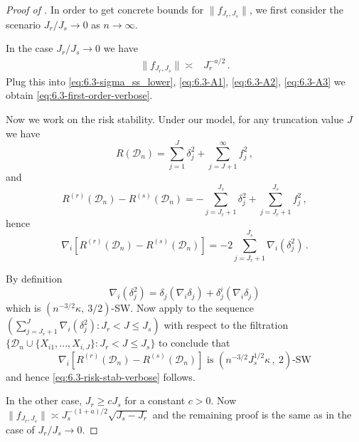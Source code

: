 \documentclass[11pt]{article}
\theoremstyle{plain}
\newcommand{\D}{{\mathcal{D}}}
\begin{document}
\begin{proof}[Proof of ]

In order to get concrete bounds for $\|f_{J_r,J_s}\|$, we first consider the scenario $J_r/J_s\rightarrow 0$ as $n\rightarrow\infty$. 

In the case $J_r/J_s\rightarrow 0$ we have 
\begin{align*}
\| f_{J_r,J_s}\|\asymp & J_r^{-a/2}\,.
\end{align*}
Plug this into \eqref{eq:6.3-sigma_ss_lower}, \eqref{eq:6.3-A1}, \eqref{eq:6.3-A2}, \eqref{eq:6.3-A3} we obtain
\eqref{eq:6.3-first-order-verbose}.

Now we work on the risk stability.  Under our model, for any truncation value $J$ we have
$$R(\D_n)=\sum_{j=1}^J \delta_j^2+\sum_{j=J+1}^\infty f_j^2\,,$$
and
$$
R^{(r)}(\D_n)-R^{(s)}(\D_n) = -\sum_{j=J_r+1}^{J_s} \delta_j^2+\sum_{j=J_r+1}^{J_s}f_j^2\,,
$$
hence
$$\nabla_i \left[R^{(r)}(\D_n)-R^{(s)}(\D_n)\right]=-2\sum_{j=J_r+1}^{J_s}\nabla_i(\delta_j^2)\,.$$

By definition
$$
\nabla_i(\delta_j^2) = \delta_j(\nabla_i\delta_j)+\delta_j^i(\nabla_i\delta_j)
$$
which is $(n^{-3/2}\kappa,~3/2)$-SW.  Now apply  to the sequence $(\sum_{j=J_r+1}^J\nabla_i(\delta_j^2):J_r<J\le J_s)$ with respect to the filtration $\{\D_n\cup\{X_{i1},...,X_{i,J}\}:J_r<J\le J_s\}$ to conclude that
$$
\nabla_i \left[R^{(r)}(\D_n)-R^{(s)}(\D_n)\right] \text{ is } \left(n^{-3/2}J_s^{1/2}\kappa\,,~2\right)\text{-SW}
$$
and hence \eqref{eq:6.3-risk-stab-verbose} follows.

In the other case, $J_r\ge  c J_s$ for a constant $c>0$. Now 
$\|f_{J_r,J_s}\|\asymp J_s^{-(1+a)/2}\sqrt{J_s-J_r}$ and the remaining proof is the same as in the  case of $J_r/J_s\rightarrow 0$.
\end{proof}
\end{document}
